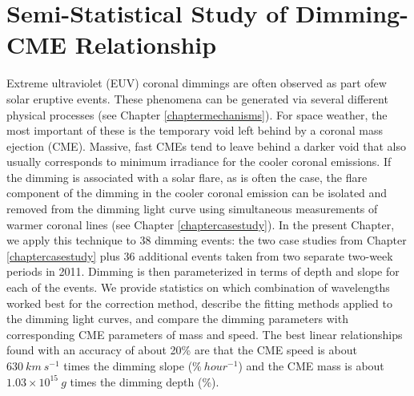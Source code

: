 \chapter{Semi-Statistical Study of Dimming-CME Relationship}
\label{chapterstatistical}

Extreme ultraviolet (EUV) coronal dimmings are often observed as part ofew solar eruptive events. These phenomena can be generated via several different physical processes (see Chapter \ref{chaptermechanisms}). For space weather, the most important of these is the temporary void left behind by a coronal mass ejection (CME). Massive, fast CMEs tend to leave behind a darker void that also usually corresponds to minimum irradiance for the cooler coronal emissions. If the dimming is associated with a solar flare, as is often the case, the flare component of the dimming in the cooler coronal emission can be isolated and removed from the dimming light curve using simultaneous measurements of warmer coronal lines (see Chapter \ref{chaptercasestudy}). In the present Chapter, we apply this technique to 38 dimming events: the two case studies from Chapter \ref{chaptercasestudy} plus 36 additional events taken from two separate two-week periods in 2011. Dimming is then parameterized in terms of depth and slope for each of the events. We provide statistics on which combination of wavelengths worked best for the correction method, describe the fitting methods applied to the dimming light curves, and compare the dimming parameters with corresponding CME parameters of mass and speed. The best linear relationships found with an accuracy of about 20\% are that the CME speed is about $630\ km\ s^{-1}$ times the dimming slope ($\%\ hour^{-1}$) and the CME mass is about $1.03 \times 10^{15}\ g$ times the dimming depth (\%). 


